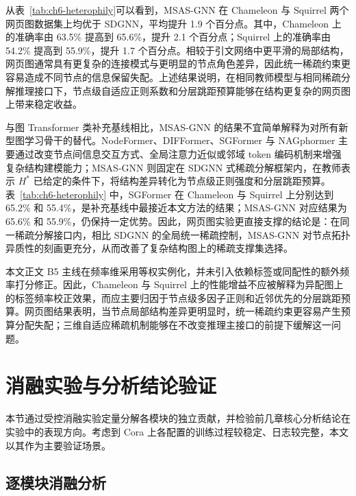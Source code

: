 从表~\ref{tab:ch6-heterophily}可以看到，MSAS-GNN 在 Chameleon 与 Squirrel 两个网页图数据集上均优于 SDGNN，平均提升 1.9 个百分点。其中，Chameleon 上的准确率由 63.5\% 提高到 65.6\%，提升 2.1 个百分点；Squirrel 上的准确率由 54.2\% 提高到 55.9\%，提升 1.7 个百分点。相较于引文网络中更平滑的局部结构，网页图通常具有更复杂的连接模式与更明显的节点角色差异，因此统一稀疏约束更容易造成不同节点的信息保留失配。上述结果说明，在相同教师模型与相同稀疏分解推理接口下，节点级自适应正则系数和分层跳距预算能够在结构更复杂的网页图上带来稳定收益。

与图 Transformer 类补充基线相比，MSAS-GNN 的结果不宜简单解释为对所有新型图学习骨干的替代。NodeFormer、DIFFormer、SGFormer 与 NAGphormer 主要通过改变节点间信息交互方式、全局注意力近似或邻域 token 编码机制来增强复杂结构建模能力；MSAS-GNN 则固定在 SDGNN 式稀疏分解框架内，在教师表示 $H^*$ 已给定的条件下，将结构差异转化为节点级正则强度和分层跳距预算。表~\ref{tab:ch6-heterophily} 中，SGFormer 在 Chameleon 与 Squirrel 上分别达到 65.2\% 和 55.4\%，是补充基线中最接近本文方法的结果；MSAS-GNN 对应结果为 65.6\% 和 55.9\%，仍保持一定优势。因此，网页图实验更直接支撑的结论是：在同一稀疏分解接口内，相比 SDGNN 的全局统一稀疏控制，MSAS-GNN 对节点拓扑异质性的刻画更充分，从而改善了复杂结构图上的稀疏支撑集选择。

本文正文 B5 主线在频率维采用等权实例化，并未引入依赖标签或同配性的额外频率打分修正。因此，Chameleon 与 Squirrel 上的性能增益不应被解释为异配图上的标签频率校正效果，而应主要归因于节点级多因子正则和近邻优先的分层跳距预算。网页图结果表明，当节点局部结构差异更明显时，统一稀疏约束更容易产生预算分配失配；三维自适应稀疏机制能够在不改变推理主接口的前提下缓解这一问题。

\section{消融实验与分析结论验证}
\label{sec:ch6-ablation}

本节通过受控消融实验定量分解各模块的独立贡献，并检验前几章核心分析结论在实验中的表现方向。考虑到 Cora 上各配置的训练过程较稳定、日志较完整，本文以其作为主要验证场景。

\subsection{逐模块消融分析}
\label{subsec:ch6-modular}

